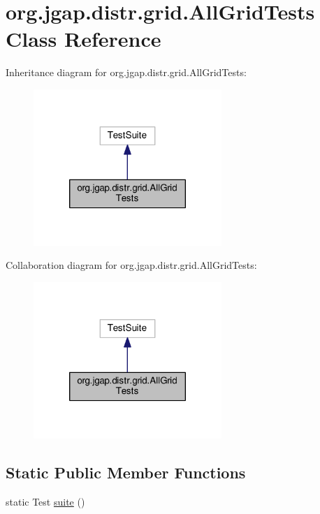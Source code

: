 \hypertarget{classorg_1_1jgap_1_1distr_1_1grid_1_1_all_grid_tests}{\section{org.\-jgap.\-distr.\-grid.\-All\-Grid\-Tests Class Reference}
\label{classorg_1_1jgap_1_1distr_1_1grid_1_1_all_grid_tests}
}


Inheritance diagram for org.\-jgap.\-distr.\-grid.\-All\-Grid\-Tests\-:
\nopagebreak
\begin{figure}[H]
\begin{center}
\leavevmode
\includegraphics[width=202pt]{classorg_1_1jgap_1_1distr_1_1grid_1_1_all_grid_tests__inherit__graph}
\end{center}
\end{figure}


Collaboration diagram for org.\-jgap.\-distr.\-grid.\-All\-Grid\-Tests\-:
\nopagebreak
\begin{figure}[H]
\begin{center}
\leavevmode
\includegraphics[width=202pt]{classorg_1_1jgap_1_1distr_1_1grid_1_1_all_grid_tests__coll__graph}
\end{center}
\end{figure}
\subsection*{Static Public Member Functions}
\begin{DoxyCompactItemize}
\item 
static Test \hyperlink{classorg_1_1jgap_1_1distr_1_1grid_1_1_all_grid_tests_a513507730dfff763ee5ea8950f146c69}{suite} ()
\end{DoxyCompactItemize}

